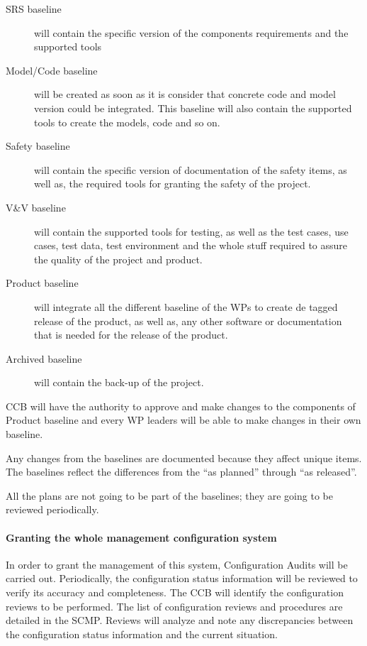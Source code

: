 \documentclass{template/openetcs_article}
\begin{document}
\begin{description}
\item[SRS baseline] will contain the specific version of the components requirements and the supported tools
\item[Model/Code baseline] will be created as soon as it is consider that concrete code and model version could be integrated. This baseline will also contain the supported tools to create the models, code and so on.
\item[Safety baseline] will contain the specific version of documentation of the safety items, as well as, the required tools for granting the safety of the project. 
\item[V\&V baseline] will contain the supported tools for testing, as well as the test cases, use cases, test data, test environment and the whole stuff required to assure the quality of the project and product.
\item[Product baseline] will integrate all the different baseline of the WPs to create de tagged release of the product, as well as, any other software or documentation that is needed for the release of the product.
\item[Archived baseline] will contain the back-up of the project. 
\end{description}
CCB will have the authority to approve and make changes to the components of Product baseline and every WP leaders will be able to make changes in their own baseline.

Any changes from the baselines are documented because they affect unique items. The baselines reflect the differences from the ``as planned'' through ``as released''.

All the plans are not going to be part of the baselines; they are going to be reviewed periodically.


\paragraph{Granting the whole management configuration system}

In order to grant the management of this system, Configuration Audits will be carried out. Periodically, the configuration status information will be reviewed to verify its accuracy and completeness.  The CCB will identify the configuration reviews to be performed. The list of configuration reviews and procedures are detailed in the SCMP. Reviews will analyze and note any discrepancies between the configuration status information and the current situation.
\end{document}
